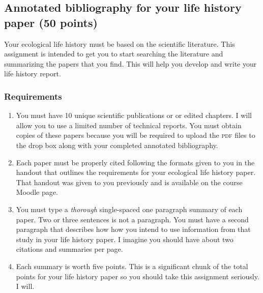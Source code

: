 \documentclass[12pt]{article}
\begin{document}
\thispagestyle{plain}


\subsection*{Annotated bibliography for your life history paper (50 points)}

Your ecological life history must be based on the scientific literature. This assignment is intended to get you to start searching the literature and summarizing the papers that you find. This will help you develop and write your life history report. 

\subsubsection*{Requirements}

\begin{enumerate}[leftmargin=*]

\item You must have 10 unique scientific publications or or edited chapters. I will allow you to use a limited number of technical reports. You must obtain copies of these papers because you will be required to upload the \textsc{pdf} files to the drop box along with your completed annotated bibliography.

\item Each paper must be properly cited following the formats given to you in the handout that outlines the requirements for your ecological life history paper. That handout was given to you previously and is available on the course Moodle page.

\item You must type a \emph{thorough} single-spaced one paragraph summary of each paper. Two or three sentences is not a paragraph. You must have a second paragraph that describes how how you intend to use information from that study in your life history paper. I imagine you should have about two citations and summaries per page. 

\item Each summary is worth five points. This is a significant chunk of the total points for your life history paper so you should take this assignment seriously. I will.

\end{enumerate}
\end{document}
